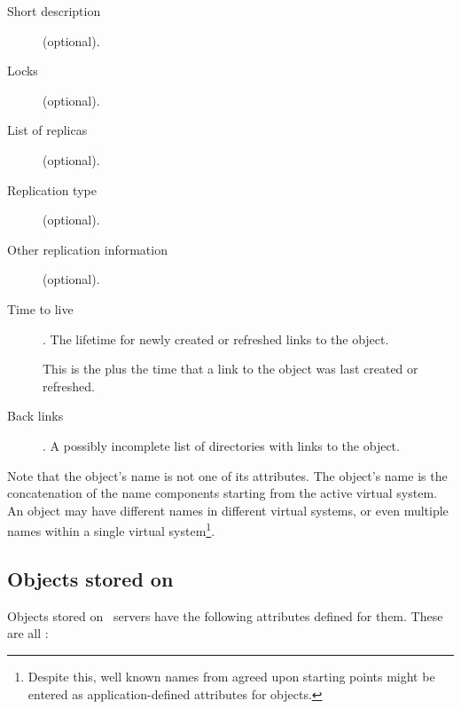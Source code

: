 \begin{description}
\item[Short description] (optional). 

\item[Locks] (optional).

\item[List of replicas] (optional).  

\item[Replication type] (optional).  

\item[Other replication information] (optional).  

\item[Time to live].  The lifetime for newly created or refreshed
links to the object.  

\item[]  This is the  plus the
time that a link to the object was last created or refreshed.

\item[Back links].  A possibly incomplete list of directories
with links to the object.
\end{description}

Note that the object's name is not one of its attributes.  The
object's name is the concatenation of the name components starting from the
active virtual system.  An object may have different names in
different virtual systems, or even multiple names within a single
virtual system\footnote{Despite this, well known names from agreed
upon starting points might be entered as application-defined attributes for
objects.}.

\subsection{Objects stored on \unix}

Objects stored on \unix\ servers have the following attributes defined
for them.  These are all :


